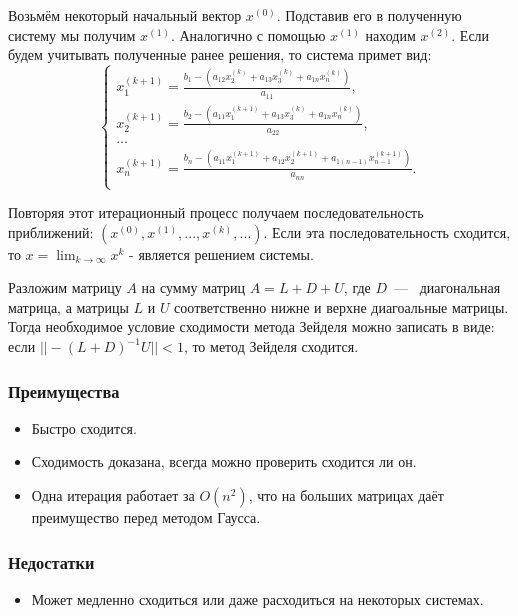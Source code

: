 \documentclass[12pt,a4paper,oneside]{extarticle}
\begin{document}
            Возьмём некоторый начальный вектор $x^{(0)}$. Подставив его в полученную систему мы получим $x^{(1)}$. Аналогично с помощью $x^{(1)}$ находим $x^{(2)}$. Если будем учитывать полученные ранее решения, то система примет вид:
            \begin{equation*}
                \begin{cases}
                    x_1^{(k+1)} = \frac{b_1-(a_{12}x_2^{(k)} + a_{13}x_3^{(k)} + a_{1n}x_n^{(k)})}{a_{11}}, \\
                    x_2^{(k+1)} = \frac{b_2-(a_{11}x_1^{(k+1)} + a_{13}x_3^{(k)} + a_{1n}x_n^{(k)})}{a_{22}}, \\
                    ... \\
                    x_n^{(k+1)} = \frac{b_n-(a_{11}x_1^{(k+1)} + a_{12}x_2^{(k+1)} + a_{1(n-1)}x_{n-1}^{(k+1)})}{a_{nn}}. \\
                \end{cases}
            \end{equation*}

             Повторяя этот итерационный процесс получаем последовательность приближений: $(x^{(0)}, x^{(1)}, ... , x^{(k)}, ...)$. Если эта последовательность сходится, то $x=\lim_{k \to \infty}x^k$ - является решением системы.

             Разложим матрицу $A$ на сумму матриц $A=L+D+U$, где $D$~---~ диагональная матрица, а матрицы $L$ и $U$ соответственно нижне и верхне диагоальные матрицы. Тогда необходимое условие сходимости метода Зейделя можно записать в виде: \\если $||-(L+D)^{-1}U||<1$, то метод Зейделя сходится.

        \subsubsection{Преимущества}
            \begin{itemize}
                \item Быстро сходится.
                \item Сходимость доказана, всегда можно проверить сходится ли он.
                \item Одна итерация работает за $O(n^2)$, что на больших матрицах даёт преимущество перед методом Гаусса.
            \end{itemize}
        \subsubsection{Недостатки}
            \begin{itemize}
                \item Может медленно сходиться или даже расходиться на некоторых системах.
            \end{itemize}
\end{document}
